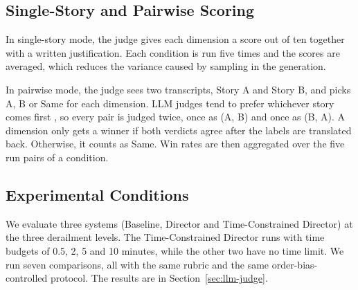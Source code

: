 \subsection{Single-Story and Pairwise Scoring}

In single-story mode, the judge gives each dimension a score out of ten together with a written justification. Each condition is run five times and the scores are averaged, which reduces the variance caused by sampling in the generation.

In pairwise mode, the judge sees two transcripts, Story A and Story B, and picks A, B or Same for each dimension. LLM judges tend to prefer whichever story comes first \cite{zheng2023judging}, so every pair is judged twice, once as (A, B) and once as (B, A). A dimension only gets a winner if both verdicts agree after the labels are translated back. Otherwise, it counts as Same. Win rates are then aggregated over the five run pairs of a condition.

\subsection{Experimental Conditions}

We evaluate three systems (Baseline, Director and Time-Constrained Director) at the three derailment levels. The Time-Constrained Director runs with time budgets of 0.5, 2, 5 and 10 minutes, while the other two have no time limit. We run seven comparisons, all with the same rubric and the same order-bias-controlled protocol. The results are in Section~\ref{sec:llm-judge}.

